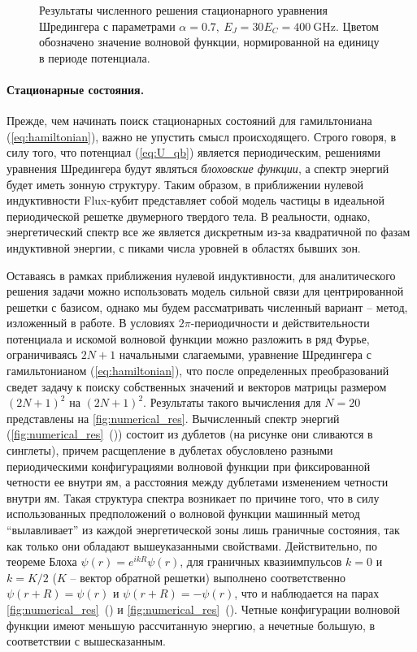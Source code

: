 \documentclass[12pt, twoside]{report}
\numberwithin{equation}{section}
\numberwithin{figure}{section}
\begin{document}
\begin{figure}[!p]
\endgroup
\caption{Результаты численного решения стационарного уравнения Шредингера с параметрами $\alpha=0.7,\ E_J  = 30E_C = 400\ \text{GHz}$. Цветом обозначено значение волновой функции, нормированной на единицу в периоде потенциала.}
\label{fig:numerical_res}
\end{figure} 

\paragraph{Стационарные состояния.} Прежде, чем начинать поиск стационарных состояний для гамильтониана (\ref{eq:hamiltonian}), важно не упустить смысл происходящего. Строго говоря, в силу того, что потенциал (\ref{eq:U_qb}) является периодическим, решениями уравнения Шредингера будут являться \textit{блоховские функции}, а спектр энергий будет иметь зонную структуру. Таким образом, в приближении нулевой индуктивности Flux-кубит представляет собой модель частицы в идеальной периодической решетке двумерного твердого тела. В реальности, однако, энергетический спектр все же является дискретным из-за квадратичной по фазам индуктивной энергии\cite{Robertson2006}, с пиками числа уровней в областях бывших зон. 

Оставаясь в рамках приближения нулевой индуктивности, для аналитического решения задачи можно использовать модель сильной связи для центрированной решетки с базисом, однако мы будем рассматривать численный вариант -- метод, изложенный в работе\cite{Johansson}. В условиях $2\pi$-периодичности и действительности потенциала и искомой волновой функции можно разложить в ряд Фурье, ограничиваясь $2N+1$ начальными слагаемыми, уравнение Шредингера с гамильтонианом (\ref{eq:hamiltonian}), что после определенных преобразований сведет задачу к поиску собственных значений и векторов матрицы размером $(2N+1)^2$ на $(2N+1)^2$. Результаты такого вычисления для $N=20$ представлены на \autoref{fig:numerical_res}. Вычисленный спектр энергий (\autoref{fig:numerical_res}~()) состоит из дублетов (на рисунке они сливаются в синглеты), причем расщепление в дублетах обусловлено разными периодическими конфигурациями волновой функции при фиксированной четности ее внутри ям, а расстояния между дублетами изменением четности внутри ям. Такая структура спектра возникает по причине того, что в силу использованных предположений о волновой функции машинный метод ``вылавливает'' из каждой энергетической зоны лишь граничные состояния, так как только они обладают вышеуказанными свойствами. Действительно, по теореме Блоха $\psi(r) = e^{ikR}\psi(r)$, для граничных квазиимпульсов $k = 0$  и $k = K/2$ ($K$ -- вектор обратной решетки) выполнено соответственно $\psi(r+R) = \psi(r)$ и $\psi(r+R)=-\psi(r)$, что и наблюдается на парах \autoref{fig:numerical_res}~() и \autoref{fig:numerical_res}~(). Четные конфигурации волновой функции имеют меньшую рассчитанную энергию, а нечетные большую, в соответствии с вышесказанным.
\end{document}
